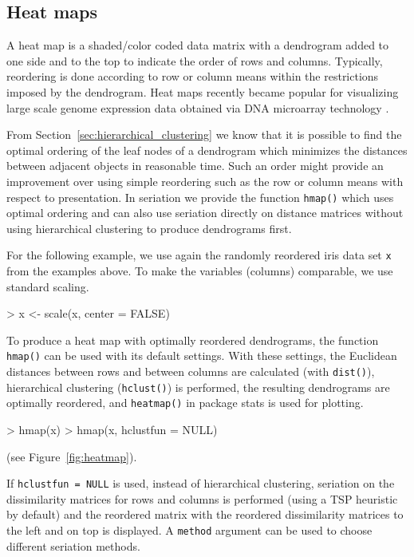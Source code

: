 \documentclass[fleqn, a4paper]{article}
\newcommand{\strong}[1]{{\normalfont\fontseries{b}\selectfont #1}}
\newcommand{\func}[1]{\mbox{\texttt{#1()}}}
\newcommand{\code}[1]{\mbox{\texttt{#1}}}
\newcommand{\pkg}[1]{\strong{#1}}
\begin{document}
\subsection{Heat maps}

A heat map is a shaded/color coded data matrix with a dendrogram added to one
side and to the top to indicate the order of rows and columns. Typically,
reordering is done according to row or column means within the restrictions
imposed by the dendrogram. Heat maps recently became popular for visualizing
large scale genome expression data obtained via DNA microarray technology
\citep[see, e.g.,][]{seriation:Eisen:1998}. 

From Section~\ref{sec:hierarchical_clustering} we know that it is possible to
find the optimal ordering of the leaf nodes of a dendrogram which minimizes
the distances between adjacent objects in reasonable time.  Such an order might
provide an improvement over using simple reordering such as the row or column
means with respect to presentation. In \pkg{seriation} we provide
the function \func{hmap} which uses optimal ordering and can also use 
seriation directly on distance matrices without using hierarchical
clustering to produce dendrograms first.

For the following example, we use again the randomly reordered iris data set
\code{x} from the examples above. To make the variables (columns) comparable,
we use standard scaling.

\begin{Schunk}
\begin{Sinput}
> x <- scale(x, center = FALSE)
\end{Sinput}
\end{Schunk}

To produce a heat map with optimally reordered dendrograms, the function
\func{hmap} can be used with its default settings. With these settings, the
Euclidean distances between rows and between columns are calculated (with
\func{dist}), hierarchical clustering (\func{hclust}) is performed, the
resulting dendrograms are optimally reordered, and \func{heatmap} in package
\pkg{stats} is used for plotting. 
\begin{Schunk}
\begin{Sinput}
> hmap(x)
> hmap(x, hclustfun = NULL)
\end{Sinput}
\end{Schunk}
(see Figure~\ref{fig:heatmap}).

If \code{hclustfun = NULL} is used, instead of hierarchical clustering,
seriation on the dissimilarity matrices for rows and columns is
performed (using a TSP heuristic by default) and the reordered matrix
with the reordered dissimilarity matrices to the left and on top is
displayed.  A \code{method} argument can be used to choose different
seriation methods.
\end{document}
